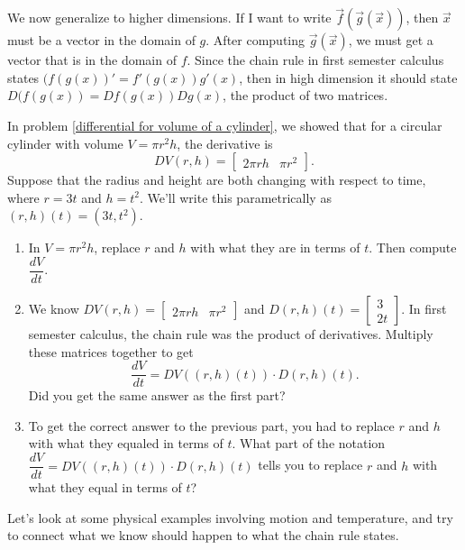 We now generalize to higher dimensions. If I want to write $\vec f(\vec g(\vec x))$, then $\vec x$ must be a vector in the domain of $g$.  After computing $\vec g(\vec x)$, we must get a vector that is in the domain of $f$.  Since the chain rule in first semester calculus states $(f(g(x))'=f'(g(x))g'(x)$, then in high dimension it should state $D(f(g(x)) = Df(g(x))Dg(x)$, the product of two matrices. 

\begin{problem}
 In problem \ref{differential for volume of a cylinder}, we showed that for a circular cylinder with volume $V=\pi r^2 h$, the derivative is 
$$DV(r,h)=\begin{bmatrix}
2\pi rh & \pi r^2
\end{bmatrix}.$$  
Suppose that the radius and height are both changing with respect to time, where $r=3t$ and $h=t^2$. We'll write this parametrically as $(r,h)(t) = (3t, t^2)$.  
\begin{enumerate}
 \item In $V=\pi r^2 h$, replace $r$ and $h$ with what they are in terms of $t$. Then compute $\dfrac{dV}{dt}$. 
 \item We know 
$DV(r,h)=\begin{bmatrix}
2\pi rh & \pi r^2
\end{bmatrix}$ and
$D(r,h)(t)=
\begin{bmatrix}
3\\  2t
\end{bmatrix}.$
In first semester calculus, the chain rule was the product of derivatives. Multiply these matrices together to get $$\dfrac{dV}{dt}=DV((r,h)(t))\cdot D(r,h)(t).$$ Did you get the same answer as the first part? 
 \item To get the correct answer to the previous part, you had to replace $r$ and $h$ with what they equaled in terms of $t$.  What part of the notation $\dfrac{dV}{dt}=DV((r,h)(t))\cdot D(r,h)(t)$ tells you to replace $r$ and $h$ with what they equal in terms of $t$?
\end{enumerate}



\end{problem}


Let's look at some physical examples involving motion and temperature, and try to connect what we know should happen to what the chain rule states.


